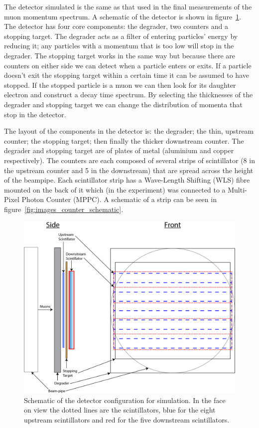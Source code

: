 The detector simulated is the same as that used in the final measurements of the muon momentum spectrum. A schematic of the detector is shown in figure~\ref{fig:images_Detector_setup_music5}. The detector has four core components: the degrader, two counters and a stopping target. The degrader acts as a filter of entering particles' energy by reducing it; any particles with a momentum that is too low will stop in the degrader. The stopping target works in the same way but because there are counters on either side we can detect when a particle enters or exits. If a particle doesn't exit the stopping target within a certain time it can be assumed to have stopped. If the stopped particle is a muon we can then look for its daughter electron and construct a decay time spectrum. By selecting the thicknesses of the degrader and stopping target we can change the distribution of momenta that stop in the detector.

The layout of the components in the detector is: the degrader; the thin, upstream counter; the stopping target; then finally the thicker downstream counter. The degrader and stopping target are of plates of metal (aluminium and copper respectively). The counters are each composed of several strips of scintillator (8 in the upstream counter and 5 in the downstream) that are spread across the height of the beampipe. Each scintillator strip has a Wave-Length Shifting (WLS) fibre mounted on the back of it which (in the experiment) was connected to a Multi-Pixel Photon Counter (MPPC). A schematic of a strip can be seen in figure~\ref{fig:images_counter_schematic}.

\begin{figure}[hptb]
  \centering
    \includegraphics[width=.9\textwidth]{images/Detector_setup_music5.png}
  \caption{Schematic of the detector configuration for simulation. In the face on view the dotted lines are the scintillators, blue for the eight upstream scintillators and red for the five downstream scintillators.}
  \label{fig:images_Detector_setup_music5}
\end{figure}

